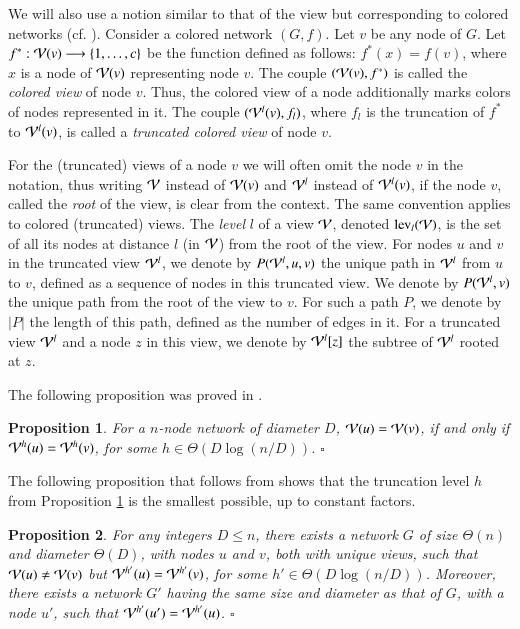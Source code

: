 \documentclass[a4paper,10pt]{article}
\newtheorem{proposition}{Proposition}[section]
\newcommand{\view}[1][]{\if!#1!\mathcal{V}\else\mathcal{V}^{#1}\fi}
\newcommand{\levelInView}[2]{\textup{lev}_{#2}(#1)}   \newcommand{\diam}{D}
\newcommand{\cV}{{\cal V}}
\newcommand{\qed}{\hfill $\square$ \smallbreak}
\begin{document}
We will also use a notion similar to that of the view but corresponding to colored networks (cf. \cite{Norris}). Consider a colored network $(G,f)$. Let $v$ be any node of $G$. 
Let $f^*: \cV(v) \longrightarrow \{1,\dots , c\} $ be the function defined as follows:
$f^*(x)=f(v)$, where  $x$ is a node of $\cV(v)$ representing node $v$.
The couple $(\cV(v), f^*)$ is called the {\em colored view} of node $v$.
Thus, the colored view of a node additionally marks colors of nodes represented in it.
The couple $(\cV^{l}(v), f_l)$, where $f_l$ is the truncation of $f^*$ to $\cV^l(v)$, is called a 
{\em truncated  colored view} of node $v$.

For the (truncated) views of a node $v$ we will often omit the node $v$ in the notation,
thus writing $\cV$ instead of $\cV (v)$ and $\cV^l$ instead of $\cV^l(v)$, if the node $v$, called
the {\em root} of the view, is clear from the context. The same convention applies to 
colored (truncated) views. The \emph{level} $l$ of a view $\cV$, denoted $\levelInView{\cV}{l}$, is the set of all its nodes at distance $l$ (in $\cV$) from the root of the view. For nodes $u$ and $v$ in the truncated view $\cV ^l$, we denote by $P(\cV ^l,u,v)$ the unique path in $\cV ^l$ from $u$ to $v$,
defined as a sequence of nodes in this truncated view. We denote by $P(\cV ^l,v)$ the unique path from the root of the view to $v$. For such a path $P$, we denote by $|P|$ the length of this path,
defined as the number of edges in it. For a truncated view $\cV ^l$ and a node $z$ in this view,
we denote by $\cV ^l[z]$ the subtree of  $\cV ^l$ rooted at $z$.


The following proposition was proved in \cite{H}.
\begin{proposition}\label{trunc}
For a $n$-node network of diameter $D$,
$\cV(u)=\cV(v)$, if and only if $\cV^{h}(u)=\cV^{h}(v)$,
for some $h \in \Theta(D \log (n/D))$.
\qed\end{proposition}

The following proposition that follows from \cite{DKP} shows that the truncation level $h$ from Proposition \ref{trunc}
is the smallest possible, up to constant factors.

\begin{proposition}\label{trunc-lower}
For any integers $D\leq n$, there exists a network $G$ of size $\Theta(n)$ and diameter $\Theta(D)$, with nodes $u$ and $v$, both with unique views,
such that $\cV(u)\neq \cV(v)$ but $\cV^{h'}(u)=\cV^{h'}(v)$,
for some $h' \in \Theta(D \log (n/D))$.
Moreover, there exists a network $G'$ having the same size and diameter as that of $G$, with a node $u'$, such that $\view[h'](u')=\view[h'](u)$.
 \qed\end{proposition}
 
\end{document}
